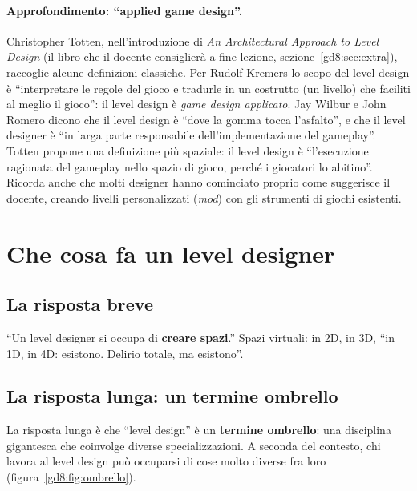 \paragraph{Approfondimento: ``applied game design''.} Christopher Totten,
nell'introduzione di \emph{An Architectural Approach to Level Design} (il
libro che il docente consiglierà a fine lezione, sezione~\ref{gd8:sec:extra}),
raccoglie alcune definizioni classiche. Per Rudolf Kremers lo scopo del level
design è ``interpretare le regole del gioco e tradurle in un costrutto (un
livello) che faciliti al meglio il gioco'': il level design è \emph{game design
applicato}. Jay Wilbur e John Romero dicono che il level design è ``dove la
gomma tocca l'asfalto'', e che il level designer è ``in larga parte
responsabile dell'implementazione del gameplay''. Totten propone una
definizione più spaziale: il level design è ``l'esecuzione ragionata del
gameplay nello spazio di gioco, perché i giocatori lo abitino''. Ricorda anche
che molti designer hanno cominciato proprio come suggerisce il docente,
creando livelli personalizzati (\emph{mod}) con gli strumenti di giochi
esistenti.

\section{Che cosa fa un level designer}
\label{gd8:sec:cosa-fa}



\subsection{La risposta breve}

``Un level designer si occupa di \textbf{creare spazi}.'' Spazi virtuali: in
2D, in 3D, ``in 1D, in 4D: esistono. Delirio totale, ma esistono''.

\subsection{La risposta lunga: un termine ombrello}

La risposta lunga è che ``level design'' è un \textbf{termine ombrello}: una
disciplina gigantesca che coinvolge diverse specializzazioni. A seconda del
contesto, chi lavora al level design può occuparsi di cose molto diverse fra
loro (figura~\ref{gd8:fig:ombrello}).

